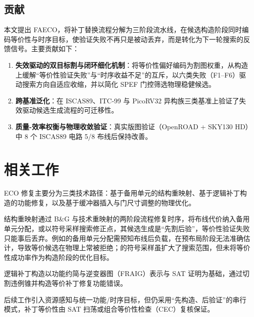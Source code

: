 \documentclass[journal]{IEEEtran}
\begin{document}
\subsection{贡献}

本文提出 FAECO，将补丁替换流程分解为三阶段流水线，在候选构造阶段同时编码等价性与时序目标，使验证失败不再只是被动丢弃，而是转化为下一轮搜索的反馈信号。主要贡献如下：

\begin{enumerate}
  \item \textbf{失效驱动的双目标割与闭环细化机制}：将等价性偏好编码为割图权重，从构造上缓解“等价性验证失败”与“时序收益不足”的互斥，以六类失败（F1--F6）驱动搜索方向自适应收缩，并以简化 SPEF 门控筛选物理稳健候选。
  \item \textbf{跨基准泛化}：在 ISCAS89、ITC-99 与 PicoRV32 异构族三类基准上验证了失效驱动候选生成流程的可迁移性。
  \item \textbf{质量-效率权衡与物理收敛验证}：真实版图验证（OpenROAD + SKY130 HD）中 8 个 ISCAS89 电路 5/8 布线后保持改善。
\end{enumerate}

\section{相关工作}

ECO 修复主要分为三类技术路径：基于备用单元的结构重映射、基于逻辑补丁构造的功能修复，以及基于缓冲器插入与门尺寸调整的物理优化。

结构重映射通过 B\&G 与技术重映射的两阶段流程修复时序，将布线代价纳入备用单元分配\cite{ho2010eco,ho2012treco}，或以符号采样搜索修正点\cite{kravets2019symbolic}，其候选生成是“先割后验”，等价性验证失败只能事后丢弃。例如\cite{ho2010eco}的备用单元分配需预知布线后负载，在预布局阶段无法准确估计，导致等价候选在物理上常被拒绝；\cite{kravets2019symbolic}的符号采样虽扩大了搜索范围，但未将等价性成功率作为构造阶段的优化目标。

逻辑补丁构造以功能约简与逆变器图（FRAIG）表示与 SAT 证明为基础，通过切割违例锥并构造等价补丁修复功能错误\cite{jiang2010fraig,jiang2016resource}。

后续工作引入资源感知\cite{jiang2016resource}与统一功能/时序目标\cite{lin2011simult,luo2016unified}，但仍采用“先构造、后验证”的串行模式，补丁等价性由 SAT 扫荡或组合等价性检查（CEC）复核保证\cite{mishchenko2006sat,zhong2024stp}。
\end{document}
